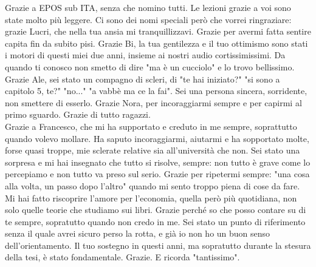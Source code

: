 \begin{acknowledgments}
Grazie a EPOS sub ITA, senza che nomino tutti. Le lezioni grazie a voi sono state molto più leggere. Ci sono dei nomi speciali però che vorrei ringraziare: grazie Lucri, che nella tua ansia mi tranquillizzavi. Grazie per avermi fatta sentire capita fin da subito pisi. Grazie Bi, la tua gentilezza e il tuo ottimismo sono stati i motori di questi miei due anni, insieme ai nostri audio cortissimissimi. Da quando ti conosco non smetto di dire "ma è un cucciolo" e lo trovo bellissimo. Grazie Ale, sei stato un compagno di scleri, di "te hai iniziato?" "si sono a capitolo 5, te?" "no..." "a vabbè ma ce la fai". Sei una persona sincera, sorridente, non smettere di esserlo. Grazie Nora, per incoraggiarmi sempre e per capirmi al primo sguardo. Grazie di tutto ragazzi.  \\
Grazie a Francesco, che mi ha supportato e creduto in me sempre, soprattutto quando volevo mollare. Ha saputo incoraggiarmi, aiutarmi e ha sopportato molte, forse quasi troppe, mie sclerate relative sia all'università che non. Sei stato una sorpresa e mi hai insegnato che tutto si risolve, sempre: non tutto è grave come lo percepiamo e non tutto va preso sul serio. Grazie per ripetermi sempre: "una cosa alla volta, un passo dopo l'altro" quando mi sento troppo piena di cose da fare. Mi hai fatto riscoprire l'amore per l'economia, quella però più quotidiana, non solo quelle teorie che studiamo sui libri. Grazie perché so che posso contare su di te sempre, sopratutto quando non credo in me. Sei stato un punto di riferimento senza il quale avrei sicuro perso la rotta, e già io non ho un buon senso dell'orientamento. Il tuo sostegno in questi anni, ma sopratutto durante la stesura della tesi, è stato fondamentale. Grazie. E ricorda "tantissimo".\\


\end{acknowledgments}
